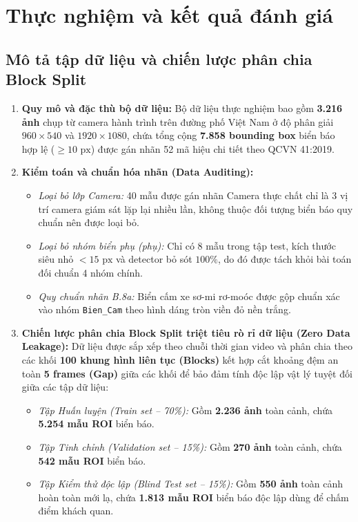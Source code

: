 \section{Thực nghiệm và kết quả đánh giá}
\label{sec:thuc_nghiem}

\subsection{Mô tả tập dữ liệu và chiến lược phân chia Block Split}
\label{subsec:dataset_blocksplit}

\begin{enumerate}
    \item \textbf{Quy mô và đặc thù bộ dữ liệu:} Bộ dữ liệu thực nghiệm bao gồm \textbf{3.216 ảnh} chụp từ camera hành trình trên đường phố Việt Nam ở độ phân giải $960 \times 540$ và $1920 \times 1080$, chứa tổng cộng \textbf{7.858 bounding box} biển báo hợp lệ ($\ge 10\text{ px}$) được gán nhãn 52 mã hiệu chi tiết theo QCVN 41:2019.

    \item \textbf{Kiểm toán và chuẩn hóa nhãn (Data Auditing):}
    \begin{itemize}
        \item \textit{Loại bỏ lớp Camera:} 40 mẫu được gán nhãn Camera thực chất chỉ là 3 vị trí camera giám sát lặp lại nhiều lần, không thuộc đối tượng biển báo quy chuẩn nên được loại bỏ.
        \item \textit{Loại bỏ nhóm biển phụ (phụ):} Chỉ có 8 mẫu trong tập test, kích thước siêu nhỏ $< 15\text{ px}$ và detector bỏ sót $100\%$, do đó được tách khỏi bài toán đối chuẩn 4 nhóm chính.
        \item \textit{Quy chuẩn nhãn B.8a:} Biển cấm xe sơ-mi rơ-moóc được gộp chuẩn xác vào nhóm \texttt{Bien\_Cam} theo hình dáng tròn viền đỏ nền trắng.
    \end{itemize}

    \item \textbf{Chiến lược phân chia Block Split triệt tiêu rò rỉ dữ liệu (Zero Data Leakage):}
    Dữ liệu được sắp xếp theo chuỗi thời gian video và phân chia theo các khối \textbf{100 khung hình liên tục (Blocks)} kết hợp cắt khoảng đệm an toàn \textbf{5 frames (Gap)} giữa các khối để bảo đảm tính độc lập vật lý tuyệt đối giữa các tập dữ liệu:
    \begin{itemize}
        \item \textit{Tập Huấn luyện (Train set -- 70\%):} Gồm \textbf{2.236 ảnh} toàn cảnh, chứa \textbf{5.254 mẫu ROI} biển báo.
        \item \textit{Tập Tinh chỉnh (Validation set -- 15\%):} Gồm \textbf{270 ảnh} toàn cảnh, chứa \textbf{542 mẫu ROI} biển báo.
        \item \textit{Tập Kiểm thử độc lập (Blind Test set -- 15\%):} Gồm \textbf{550 ảnh} toàn cảnh hoàn toàn mới lạ, chứa \textbf{1.813 mẫu ROI} biển báo độc lập dùng để chấm điểm khách quan.
    \end{itemize}
\end{enumerate}


